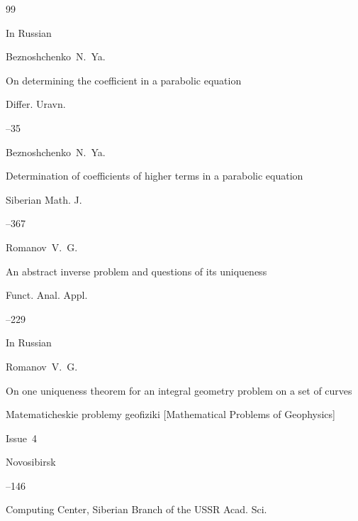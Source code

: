 \begin{thebibliography}{99}

\lang In Russian

\by  Beznoshchenko~N.~Ya.

\paper On determining the coefficient in a parabolic equation

\jour Differ. Uravn.




--35




\by  Beznoshchenko~N.~Ya.

\paper Determination of coefficients of higher terms in a parabolic equation

\jour Siberian Math. J.




--367







\by Romanov~V.~G.

\paper An abstract inverse problem and questions of its uniqueness

\jour Funct. Anal. Appl.




--229








\lang In Russian

\by Romanov~V.~G.

\paper On one uniqueness theorem for an integral geometry problem on a set of curves

\inbook Matematicheskie problemy geofiziki \rm [Mathematical Problems of Geophysics]


\issueinfo Issue~4

\publaddr Novosibirsk

--146

\publ Computing Center, Siberian Branch of the USSR Acad. Sci.





\end{thebibliography}



\EngDate



\newpage

\Russian



%

